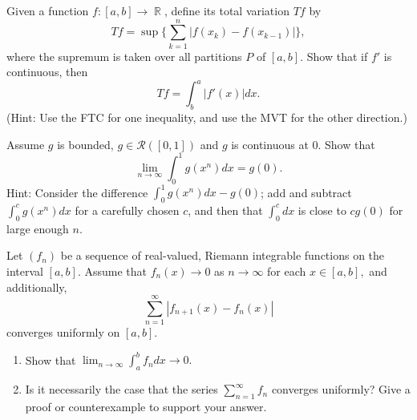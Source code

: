 \documentclass[12pt,letterpaper,boxed]{hmcpset}
\DeclareMathOperator{\R}{\mathbb{R}}
\begin{document}
\begin{solution}

\end{solution}

\begin{problem}[Exercise 2.19]
Given a function $f : [a,b]\rightarrow \R$, define its total variation $T f$ by $$T f = \sup\{\sum_{k=1}^{n} |f(x_k) - f(x_{k-1})|\},$$ where the supremum is taken over all partitions $P$ of $[a,b]$. Show that if $f'$ is continuous, then $$T f = \int_{b}^{a}|f'(x)|dx.$$ (Hint: Use the FTC for one inequality, and use the MVT for the other direction.)
\end{problem}

\begin{solution}

\end{solution}

\begin{problem}[Exercise 2.20]
Assume $g$ is bounded, $g \in \mathcal{R}([0,1])$ and $g$ is continuous at 0. Show that $$\lim_{n\rightarrow \infty}\int_{0}^{1}g(x^{n})dx = g(0).$$ Hint: Consider the difference $\int_{0}^{1}g(x^{n})dx - g(0)$; add and subtract $\int_{0}^{c} g(x^{n})dx$ for a carefully chosen $c$, and then that $\int_{0}^{c}dx$ is close to $cg(0)$ for large enough $n.$
\end{problem}

\begin{solution}

\end{solution}

\begin{problem}[Exercise 3.3]
Let $(f_n)$ be a sequence of real-valued, Riemann integrable functions on the interval $[a,b]$. Assume that $f_{n}(x)\rightarrow 0$ as $n\rightarrow\infty$ for each $x\in[a,b],$ and additionally, $$\sum_{n=1}^{\infty}|f_{n + 1}(x) - f_{n}(x)|$$ converges uniformly on $[a,b]$.
\begin{enumerate}
    \item Show that $\lim_{n \rightarrow\infty}\int_{a}^{b}f_n dx \rightarrow 0.$
    \item Is it necessarily the case that the series $\sum_{n=1}^{\infty}f_n$ converges uniformly? Give a proof or counterexample to support your answer.
\end{enumerate}
\end{problem}

\begin{solution}
\end{solution}
\end{document}
